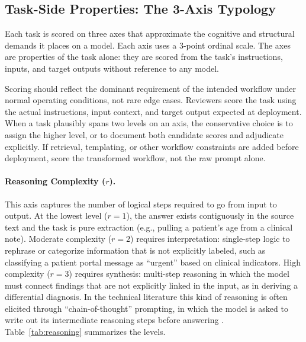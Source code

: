 \documentclass[11pt]{article}
\begin{document}
\subsection{Task-Side Properties: The 3-Axis Typology}
\label{sec:axes}

Each task is scored on three axes that approximate the cognitive and structural demands it places on a model. Each axis uses a 3-point ordinal scale. The axes are properties of the task alone: they are scored from the task's instructions, inputs, and target outputs without reference to any model.

Scoring should reflect the dominant requirement of the intended workflow under normal operating conditions, not rare edge cases. Reviewers score the task using the actual instructions, input context, and target output expected at deployment. When a task plausibly spans two levels on an axis, the conservative choice is to assign the higher level, or to document both candidate scores and adjudicate explicitly. If retrieval, templating, or other workflow constraints are added before deployment, score the transformed workflow, not the raw prompt alone.

\paragraph{Reasoning Complexity ($r$).}
This axis captures the number of logical steps required to go from input to output. At the lowest level ($r=1$), the answer exists contiguously in the source text and the task is pure extraction (e.g., pulling a patient's age from a clinical note). Moderate complexity ($r=2$) requires interpretation: single-step logic to rephrase or categorize information that is not explicitly labeled, such as classifying a patient portal message as ``urgent'' based on clinical indicators. High complexity ($r=3$) requires synthesis: multi-step reasoning in which the model must connect findings that are not explicitly linked in the input, as in deriving a differential diagnosis. In the technical literature this kind of reasoning is often elicited through ``chain-of-thought'' prompting, in which the model is asked to write out its intermediate reasoning steps before answering \cite{Wei2022, Lievin2024}. Table~\ref{tab:reasoning} summarizes the levels.
\end{document}

